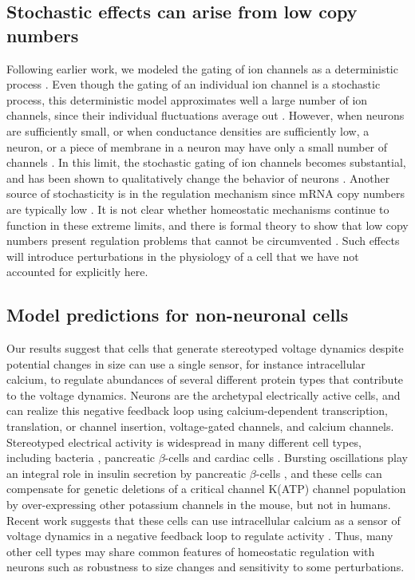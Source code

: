 \documentclass[9pt,lineno]{elife}
\begin{document}
\subsection{Stochastic effects can arise from low copy numbers}
Following earlier work, we modeled the gating of ion channels as a deterministic process \citep{Hodgkin:1952gr}. Even though the gating of an individual ion channel is a stochastic process, this deterministic model approximates well a large number of ion channels, since their individual fluctuations average out  \citep{White:2000th}. However, when neurons are sufficiently small, or when conductance densities are sufficiently low, a neuron, or a piece of membrane in a neuron may have only a small number of channels \citep{Smith:2002cn}. In this limit, the stochastic gating of ion channels becomes substantial, and has been shown to qualitatively change the behavior of neurons  \citep{Chow:1996gz, Sengupta:2013ba}. Another source of stochasticity is in the regulation mechanism since mRNA copy numbers are typically low  \citep{Kosik:2016gs}. It is not clear whether homeostatic mechanisms continue to function in these extreme limits, and there is formal theory to show that low copy numbers present regulation problems that cannot be circumvented \citep{lestas2010fundamental}. Such effects will introduce perturbations in the physiology of a cell that we have not accounted for explicitly here.

\subsection{Model predictions for non-neuronal cells}

Our results suggest that cells that generate stereotyped voltage dynamics despite potential changes in size can use a single sensor, for instance intracellular calcium, to regulate abundances of several different protein types that contribute to the voltage dynamics. Neurons are the archetypal electrically active cells, and can realize this negative feedback loop using calcium-dependent transcription, translation, or channel insertion, voltage-gated channels, and calcium channels. Stereotyped electrical activity is widespread in many different cell types, including bacteria \citep{Masi:2015iy, Kralj:2011ke}, pancreatic $\beta$-cells \citep{Bertram:2010ff} and cardiac cells \citep{Hund:2000kz}. Bursting oscillations play an integral role in insulin secretion by pancreatic $\beta$-cells  \citep{Bertram:2010ff}, and these cells can compensate for genetic deletions of a critical channel K(ATP) channel population by over-expressing other potassium channels \citep{Yildirim:2017kj} in the mouse, but not in humans. Recent work suggests that these cells can use intracellular calcium as a sensor of voltage dynamics in a negative feedback loop to regulate activity \citep{Yildirim:2017fq}. Thus, many other cell types may share common features of homeostatic regulation with neurons such as robustness to size changes and sensitivity to some perturbations.  
\end{document}
